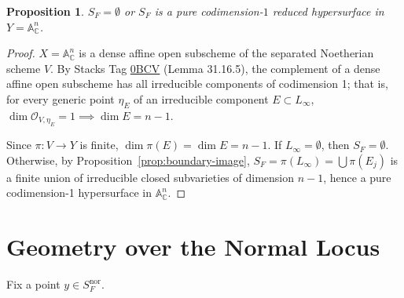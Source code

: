 \documentclass[11pt,reqno]{amsart}
\theoremstyle{plain}
\newtheorem{proposition}[theorem]{Proposition}
\theoremstyle{definition}
\numberwithin{equation}{section}
\newcommand{\A}{\mathbb{A}}
\newcommand{\C}{\mathbb{C}}
\newcommand{\cO}{\mathcal{O}}
\begin{document}
\begin{proposition}\label{prop:pure-codim-one}
$S_F = \emptyset$ or $S_F$ is a pure codimension-$1$ reduced hypersurface in $Y = \A^n_\C$.
\end{proposition}
\begin{proof}
$X = \A^n_\C$ is a dense affine open subscheme of the separated Noetherian scheme $V$. By Stacks Tag \href{https://stacks.math.columbia.edu/tag/0BCV}{0BCV} (Lemma 31.16.5), the complement of a dense affine open subscheme has all irreducible components of codimension 1; that is, for every generic point $\eta_E$ of an irreducible component $E \subset L_\infty$, $\dim \cO_{V, \eta_E} = 1 \implies \dim E = n-1$.

Since $\pi: V \to Y$ is finite, $\dim \pi(E) = \dim E = n-1$. If $L_\infty = \emptyset$, then $S_F = \emptyset$. Otherwise, by Proposition~\ref{prop:boundary-image}, $S_F = \pi(L_\infty) = \bigcup \pi(E_j)$ is a finite union of irreducible closed subvarieties of dimension $n-1$, hence a pure codimension-1 hypersurface in $\A^n_\C$.
\end{proof}

\section{Geometry over the Normal Locus}

Fix a point $y \in S_F^{\mathrm{nor}}$.
\end{document}
